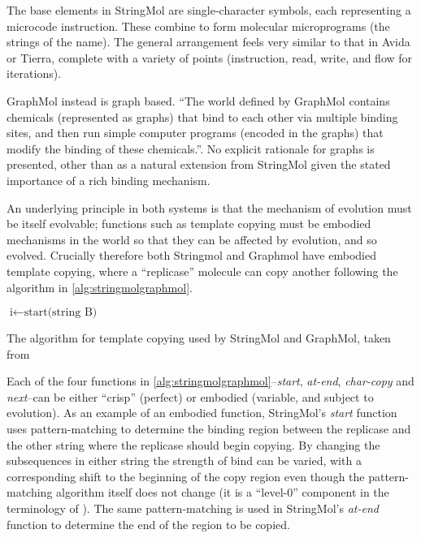 The base elements in StringMol are single-character symbols, each representing a microcode instruction. These combine to form molecular microprograms (the strings of the name). The general arrangement feels very similar to that in Avida or Tierra, complete with a variety of points (instruction, read, write, and flow for iterations).

GraphMol instead is graph based. ``The world defined by GraphMol contains chemicals (represented as graphs) that bind to each other via multiple binding sites, and then run simple computer programs (encoded in the graphs) that modify the binding of these chemicals.''. No explicit rationale for graphs is presented, other than as a natural extension from StringMol given the stated importance of a rich binding mechanism. 

An underlying principle in both systems is that the mechanism of evolution must be itself evolvable; functions such as template copying must be embodied mechanisms in the world so that they can be affected by evolution, and so evolved.  Crucially therefore both Stringmol and Graphmol have embodied template copying, where a ``replicase'' molecule can copy another following the algorithm in \ref{alg:stringmolgraphmol}.

\begin{algorithm}[ht]
$\text{i} \leftarrow \text{start(string B)}$\;
\label{alg:stringmolgraphmol}
\caption{The algorithm for template copying used by StringMol and GraphMol, taken from \textcite{Nellis2014}}
\end{algorithm}

Each of the four functions in \ref{alg:stringmolgraphmol}--\emph{start}, \emph{at-end}, \emph{char-copy} and \emph{next}--can be either ``crisp'' (\ie perfect) or embodied (variable, and subject to evolution). As an example of an embodied function, StringMol's \emph{start} function uses pattern-matching to determine the binding region between the replicase and the other string where the replicase should begin copying. By changing the subsequences in either string the strength of bind can be varied, with a corresponding shift to the beginning of the copy region even though the pattern-matching algorithm itself does not change (it is a ``level-0'' component in the terminology of \textcite{BanzhafBaumgaertnerBeslonEtAl2016}). The same pattern-matching is used in StringMol's \emph{at-end} function to determine the end of the region to be copied.

